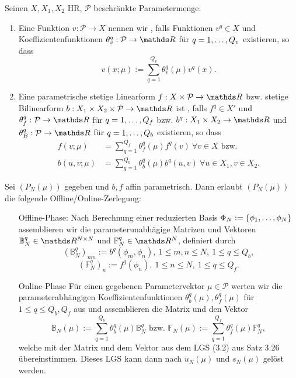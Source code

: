 Seinen $X,X_1,X_2$ HR, $\mathcal{P}$ beschränkte Parametermenge.
\begin{enumerate}[(1)]
	\item Eine Funktion $v:\mathcal{P}\to X$ nennen wir , falls Funktionen $v^q\in X$ und Koeffizientenfunktionen $\theta_v^q: \mathcal{P}\to \R$ für $q=1, \dots ,Q_v$ existieren, so dass
	\[
	v(x;\mu) := \sum_{q=1}^{Q_v} \theta_v^q(\mu)v^q(x).
	\]
	\item Eine parametrische stetige Linearform $f:X\times \mathcal{P}\to \R$ bzw. stetige Bilinearform $b:X_1\times X_2\times \mathcal{P}\to \R$ ist , falls $f^q\in X'$ und $\theta_f^q:\mathcal{P}\to \R$ für $q=1, \dots , Q_f$ bzw. $b^q:X_1\times X_2 \to \R$ und $\theta_B^q: \mathcal{P}\to \R$ für $q=1, \dots ,Q_b$ existieren, so dass
	\begin{align*}
	f(v;\mu) &= \sum_{q=1}^{Q_f} \theta_f^q(\mu) f^q(v)~\forall v\in X \text{ bzw.}\\
	b(u,v;\mu) &= \sum_{q=1}^{Q_b} \theta_b^q(\mu) b^q(u,v)~\forall u\in X_1,v\in X_2.
	\end{align*}
\end{enumerate}

Sei $(P_N(\mu))$ gegeben und $b,f$ affin parametrisch. Dann erlaubt $(P_N(\mu))$ die folgende Offline/Online-Zerlegung:
\begin{itemize}
	\item[Offline-Phase:]
	Nach Berechnung einer reduzierten Basis $\Phi_N := \left\{\phi_1, \dots ,\phi_N\right\}$ assemblieren wir die parameterunabhägige Matrizen und Vektoren $\mathbb{B}_N^q\in \R^{N\times N}$ und $\mathbb{F}_N^q\in \R^N$, definiert durch
	\[
	(\mathbb{B}_N^q)_{nm} := b^q(\phi_m,\phi_n),~1\le m,n \le N,~1\le q\le Q_b,
	\]
	\[
	(\mathbb{F}_N^q)_n := f^q(\phi_n),~1\le n\le N,~1\le q\le Q_f.
	\]
	\item[Online-Phase]
	Für einen gegebenen Parametervektor $\mu\in\mathcal{P}$ werten wir die parameterabhängigen Koeffizientenfunktionen $\theta_b^q(\mu),\theta_f^q(\mu)$ für $1\le q\le Q_b,Q_f$ aus und assemblieren die Matrix und den Vektor
	\[
	\mathbb{B}_N(\mu) := \sum_{q=1}^{Q_b} \theta_b^q(\mu) \mathbb{B}_N^q \text{ bzw. } \mathbb{F}_N(\mu) := \sum_{q=1}^{Q_f} \theta_f^q(\mu) \mathbb{F}_N^q,
	\]
	welche mit der Matrix und dem Vektor aus dem LGS (3.2) aus Satz 3.26 übereinstimmen.
	Dieses LGS kann dann nach $u_N(\mu)$ und $s_N(\mu)$ gelöst werden.
\end{itemize}

